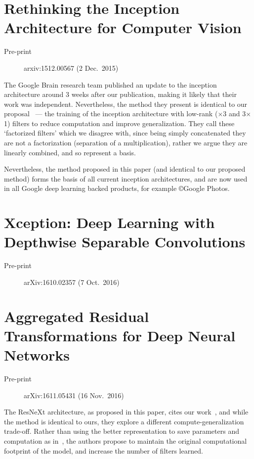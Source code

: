 \documentclass[thesis]{subfiles}
\begin{document}
\section*{Rethinking the Inception Architecture for Computer Vision}
\begin{description}
    \item[Pre-print] arxiv:1512.00567 (2 Dec.\ 2015)
\end{description}
The Google Brain research team published an update to the \Gls{inception} architecture around 3 weeks after our publication, making it likely that their work was independent. Nevertheless, the method they present is identical to our proposal~\citep{Ioannou2016} --- the training of the \Gls{inception} architecture with low-rank ($\times$3 and 3$\times$1) filters to reduce computation and improve generalization. They call these `factorized filters' which we disagree with, since being simply concatenated they are not a factorization (\ie separation of a multiplication), rather we argue they are linearly combined, and so represent a basis.

Nevertheless, the method proposed in this paper (and identical to our proposed method) forms the basis of all current \Gls{inception} architectures, and are now used in all Google deep learning backed products, for example \copyright{}Google Photos.

\section*{Xception: Deep Learning with Depthwise Separable Convolutions}
\begin{description}
    \item[Pre-print] arXiv:1610.02357 (7 Oct.\ 2016)
\end{description}

\section*{Aggregated Residual Transformations for Deep Neural Networks}
\begin{description}
    \item[Pre-print] arXiv:1611.05431 (16 Nov.\ 2016)
\end{description}
The ResNeXt architecture, as proposed in this paper, cites our work~\citep{ioannou2016e}, and while the method is identical to ours, they explore a different compute-generalization trade-off. Rather than using the better representation to save parameters and computation as in~\citep{ioannou2016e}, the authors propose to maintain the original computational footprint of the model, and increase the number of filters learned.
\end{document}
